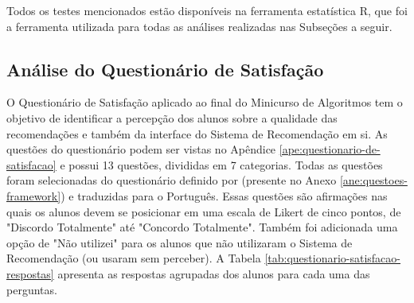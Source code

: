 Todos os testes mencionados estão disponíveis na ferramenta estatística R, que foi a ferramenta utilizada para todas as análises
realizadas nas Subseções a seguir.

\subsection{Análise do Questionário de Satisfação}\label{subsection:analise-questionario-satisfacao}

O Questionário de Satisfação aplicado ao final do Minicurso de Algoritmos tem o objetivo de identificar a percepção dos
alunos sobre a qualidade das recomendações e também da interface do Sistema de Recomendação em si. As questões do questionário
podem ser vistas no Apêndice \ref{ape:questionario-de-satisfacao} e possui 13 questões, divididas em 7 categorias. Todas
as questões foram selecionadas do questionário definido por  (presente no Anexo \ref{ane:questoes-framework})
e traduzidas para o Português. Essas questões são afirmações nas quais os alunos devem se posicionar em uma escala de
Likert de cinco pontos, de "Discordo Totalmente" até "Concordo Totalmente". Também foi adicionada uma opção de "Não utilizei" para
os alunos que não utilizaram o Sistema de Recomendação (ou usaram sem perceber). A Tabela \ref{tab:questionario-satisfacao-respostas}
apresenta as respostas agrupadas dos alunos para cada uma das perguntas.


